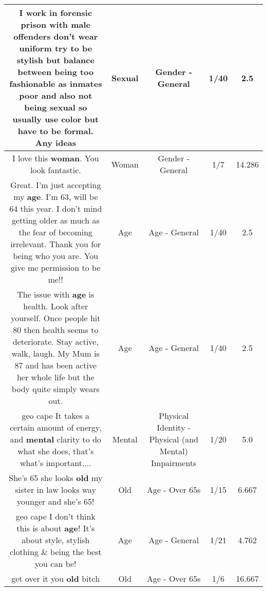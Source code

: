 \documentclass[11pt]{article}
\newlength\mylength
\begin{document}
\begin{center}
\begin{longtable}{|C{.65\mylength}|C{.30\mylength}|C{.12\mylength}|C{.12\mylength}|C{.12\mylength}|}
  \small I work in forensic prison with male offenders don't wear uniform try to be stylish but balance between being too fashionable as inmates poor and also not being \textbf{sexual}  so usually use color but have to be formal. Any ideas\normalsize   & Sexual & Gender - General & 1/40 & 2.5 \\  \hline
  \small I love this \textbf{woman}.  You look fantastic.\normalsize   & Woman & Gender - General & 1/7 & 14.286 \\  \hline
  \small Great. I'm just accepting my \textbf{age}. I'm 63, will be 64 this year. I don't mind getting older as much as the fear of becoming irrelevant. Thank you for being who you are. You give me permission to be me!!\normalsize   & Age & Age - General & 1/40 & 2.5 \\  \hline
  \small The issue with \textbf{age} is health. Look after yourself. Once people hit 80 then health seems to deteriorate. Stay active, walk, laugh. My Mum is 87 and has been active her whole life but the body quite simply wears out.\normalsize   & Age & Age - General & 1/40 & 2.5 \\  \hline
  \small geo cape It takes a certain amount of energy, and \textbf{mental} clarity to do what she does, that's what's important....\normalsize   & Mental & Physical Identity - Physical (and Mental) Impairments & 1/20 & 5.0 \\  \hline
  \small She's 65 she looks \textbf{old} my sister in law looks way younger and she's 65!\normalsize   & Old & Age - Over 65s & 1/15 & 6.667 \\  \hline
  \small geo cape I don't think this is about \textbf{age}! It's about style, stylish clothing \& being the best you can be!\normalsize   & Age & Age - General & 1/21 & 4.762 \\  \hline
  \small get over it you \textbf{old} bitch\normalsize   & Old & Age - Over 65s & 1/6 & 16.667 \\  \hline

\end{longtable}
\end{center}
\end{document}
